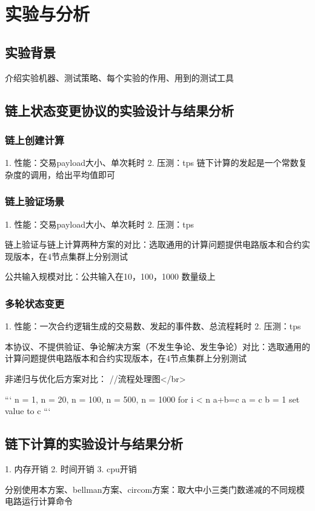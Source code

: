 \chapter{实验与分析}

\section{实验背景}
介绍实验机器、测试策略、每个实验的作用、用到的测试工具

\section{链上状态变更协议的实验设计与结果分析}

\subsection{链上创建计算}
1. 性能：交易payload大小、单次耗时
2. 压测：tps
链下计算的发起是一个常数复杂度的调用，给出平均值即可

\subsection{链上验证场景}
1. 性能：交易payload大小、单次耗时
2. 压测：tps

链上验证与链上计算两种方案的对比：选取通用的计算问题提供电路版本和合约实现版本，在4节点集群上分别测试

公共输入规模对比：公共输入在10，100，1000 数量级上

\subsection{多轮状态变更}
1. 性能：一次合约逻辑生成的交易数、发起的事件数、总流程耗时
2. 压测：tps

本协议、不提供验证、争论解决方案（不发生争论、发生争论）对比：选取通用的计算问题提供电路版本和合约实现版本，在4节点集群上分别测试

非递归与优化后方案对比：
//流程处理图</br>

```
n = 1, n = 20, n = 100, n = 500, n = 1000
for i < n {
   a+b=c
   a = c
   b = 1
}
set value to c
```


\section{链下计算的实验设计与结果分析}
1. 内存开销
2. 时间开销
3. cpu开销

分别使用本方案、bellman方案、circom方案：取大中小三类门数递减的不同规模电路运行计算命令

